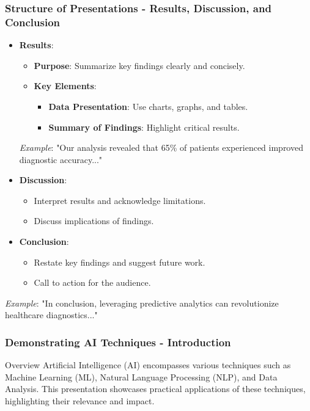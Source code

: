 \documentclass[aspectratio=169]{beamer}
\begin{document}
\begin{frame}[fragile]
    \frametitle{Structure of Presentations - Results, Discussion, and Conclusion}
    \begin{itemize}
        \item \textbf{Results}:
        \begin{itemize}
            \item \textbf{Purpose}: Summarize key findings clearly and concisely.
            \item \textbf{Key Elements}:
            \begin{itemize}
                \item \textbf{Data Presentation}: Use charts, graphs, and tables.
                \item \textbf{Summary of Findings}: Highlight critical results.
            \end{itemize}
        \end{itemize}
        \textit{Example}: "Our analysis revealed that 65\% of patients experienced improved diagnostic accuracy..."
        
        \item \textbf{Discussion}:
        \begin{itemize}
            \item Interpret results and acknowledge limitations.
            \item Discuss implications of findings.
        \end{itemize}
        
        \item \textbf{Conclusion}:
        \begin{itemize}
            \item Restate key findings and suggest future work.
            \item Call to action for the audience.
        \end{itemize}
    \end{itemize}
    \textit{Example}: "In conclusion, leveraging predictive analytics can revolutionize healthcare diagnostics..."
\end{frame}

\begin{frame}[fragile]
    \frametitle{Demonstrating AI Techniques - Introduction}
    \begin{block}{Overview}
        Artificial Intelligence (AI) encompasses various techniques such as Machine Learning (ML), Natural Language Processing (NLP), and Data Analysis. This presentation showcases practical applications of these techniques, highlighting their relevance and impact.
    \end{block}
\end{frame}
\end{document}
